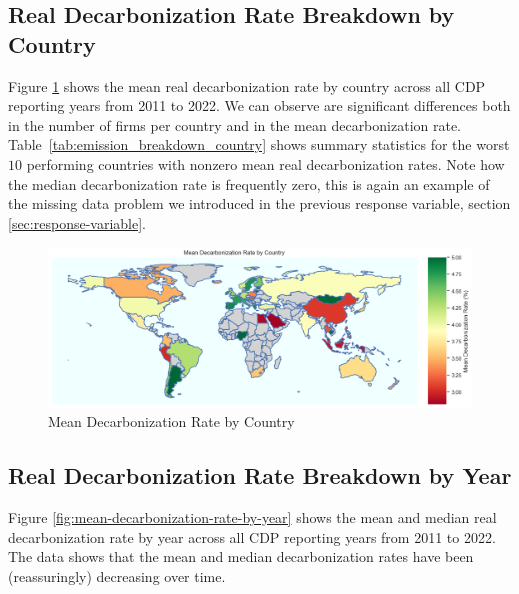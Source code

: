  

\subsection{Real Decarbonization Rate Breakdown by Country}

Figure \ref{fig:mean-decarbonization-rate-by-country} shows the mean real decarbonization rate by country across all CDP reporting years from 2011 to 2022. We can observe are significant differences both in the number of firms per country and in the mean decarbonization rate. Table~\ref{tab:emission_breakdown_country} shows summary statistics for the worst $10$ performing countries with nonzero mean real decarbonization rates. Note how the median decarbonization rate is frequently zero, this is again an example of the missing data problem we introduced in the previous response variable, section \ref{sec:response-variable}.


\begin{figure}[htbp]
    \begin{center}
    \includegraphics[width=5in]{figures/mean_decarbonization_rate_country.png}
    \caption{Mean Decarbonization Rate by Country}
    \label{fig:mean-decarbonization-rate-by-country}
    \end{center}
\end{figure}




\subsection{Real Decarbonization Rate Breakdown by Year}

Figure \ref{fig:mean-decarbonization-rate-by-year} shows the mean and median real decarbonization rate by year across all CDP reporting years from 2011 to 2022. The data shows that the mean and median decarbonization rates have been (reassuringly) decreasing over time.


